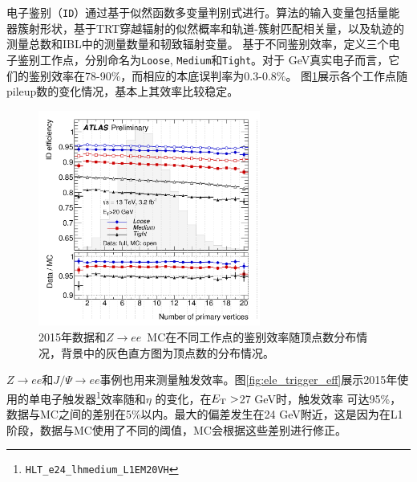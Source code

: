 电子鉴别（\texttt{ID}）通过基于似然函数多变量判别式\cite{ATLAS-CONF-2016-024}进行。算法的输入变量包括量能器簇射形状，基于TRT穿越辐射的似然概率和轨道-簇射匹配相关量，以及轨迹的测量总数和IBL中的测量数量和韧致辐射变量。
基于不同鉴别效率，定义三个电子鉴别工作点，分别命名为\texttt{Loose}, \texttt{Medium}和\texttt{Tight}。对于 GeV真实电子而言，它们的鉴别效率在78-90\%，而相应的本底误判率为0.3-0.8\%。
图\ref{fig:ele_id_eff_pileup}展示各个工作点随pileup数的变化情况，基本上其效率比较稳定。
\begin{figure}
\centering
\includegraphics[width=0.65\textwidth]{fig/ele_id_eff_pileup.png}
\caption{2015年数据和$Z\rightarrow ee$~MC在不同工作点的鉴别效率随顶点数分布情况\cite{ATLAS-CONF-2016-024}，背景中的灰色直方图为顶点数的分布情况。}
\label{fig:ele_id_eff_pileup}
\end{figure}
$Z\rightarrow ee$和$J/\Psi\rightarrow ee$事例也用来测量触发效率\cite{ATLAS-CONF-2016-024}。图\ref{fig:ele_trigger_eff}展示2015年使用的单电子触发器\footnote{\texttt{HLT\_e24\_lhmedium\_L1EM20VH}}效率随\et 和$\eta$ 的变化，在$E_{\text{T}}>$27 GeV时，触发效率
可达95\%，数据与MC之间的差别在5\%以内。最大的偏差发生在24 GeV附近，这是因为在L1阶段，数据与MC使用了不同的阈值，MC会根据这些差别进行修正。
